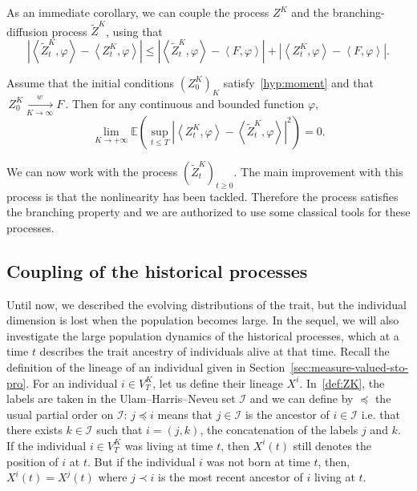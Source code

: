 \documentclass[AHL,Unicode,longabstracts,published]{cedram}
\newcommand{\Io}{\mathcal{I}}
\newcommand*\E{\mathbb{E}}
\begin{document}
As an immediate corollary, we can couple the process $Z^K$ and the branching-diffusion process $ \widetilde Z^{K}$, using that
\[
\left|\left\langle \widetilde Z^{K}_{t},\varphi\right\rangle - \left\langle Z^K_t,\varphi\right\rangle\right|\leq \left|\left\langle \widetilde Z^{K}_{t},\varphi\right\rangle - \left\langle F,\varphi\right\rangle\right|+\left|\left\langle Z^{K}_{t},\varphi\right\rangle - \left\langle F,\varphi\right\rangle\right|.
\]

\begin{prop}\label{proximity}
Assume that the initial conditions $(Z^K_0)_{K}$ satisfy~\eqref{hyp:moment} and that $\,{Z}^{K}_{0}\xrightarrow[K\to\infty]{w} F\,$. Then for any continuous and bounded function $\varphi$,
\[
\lim_{K \to +\infty}\E\left(\sup_{t \le T} \left|\left\langle Z^{K}_{t},\varphi\right\rangle-\left\langle\widetilde{Z}^{K}_{t},\varphi\right\rangle\right|^2\right) = 0.
\]
\end{prop}


We can now work with the process $(\widetilde{Z}^{K}_{t})_{t \ge 0}$. The main improvement with this process is that the nonlinearity has been tackled. Therefore the process satisfies the branching property and we are authorized to use some classical tools for these processes.



\subsection{Coupling of the historical processes}\label{section:coupling_historique}


Until now, we described the evolving distributions of the trait, but the individual dimension is lost when the population becomes large. In the sequel, we will also investigate the large population dynamics of the historical processes, which at a time $t$ describes the trait ancestry of individuals alive at that time. Recall the definition of the lineage of an individual given in Section~\ref{sec:measure-valued-sto-pro}. For an individual $i\in V^K_T$, let us define their lineage $X^i$. In~\eqref{def:ZK}, the labels are taken in the Ulam--Harris--Neveu set $\Io$ and we can define by $\preceq$ the usual partial order on $ \Io$: $j \preceq i$ means that $j\in \Io$ is the ancestor of $i\in \Io$ i.e. that there exists $k\in \Io$ such that $i=(j,k)$, the concatenation of the labels $j$ and $k$. If the individual $i\in {V}^K_{T}$ was living at time $t$, then ${X}^i(t)$ still denotes the position of $i$ at $t$. But if the individual $i$ was not born at time $t$, then, ${X}^i(t)={X}^j(t)$ where $j\prec i$ is the most recent ancestor of $i$ living at $t$.
\end{document}
